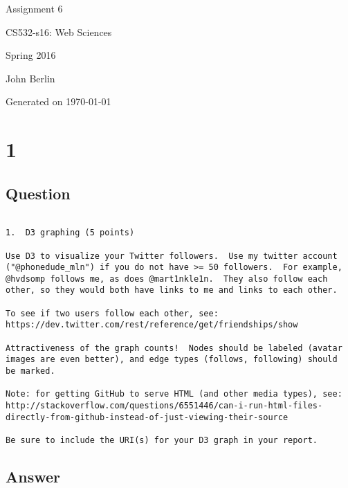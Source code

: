\documentclass[letterpaper,10pt]{article}
\begin{document}
 

\begin{titlepage}

\begin{center}

\Huge{Assignment 6}

\Large{CS532-s16:  Web Sciences}

\Large{Spring 2016}

\Large{John Berlin}

\Large Generated on \today

\end{center}

\end{titlepage}
\newpage
\section*{1}
\subsection*{Question}
\begin{verbatim}

1.  D3 graphing (5 points)

Use D3 to visualize your Twitter followers.  Use my twitter account
("@phonedude_mln") if you do not have >= 50 followers.  For example,
@hvdsomp follows me, as does @mart1nkle1n.  They also follow each
other, so they would both have links to me and links to each other.

To see if two users follow each other, see:
https://dev.twitter.com/rest/reference/get/friendships/show

Attractiveness of the graph counts!  Nodes should be labeled (avatar
images are even better), and edge types (follows, following) should
be marked.

Note: for getting GitHub to serve HTML (and other media types), see:
http://stackoverflow.com/questions/6551446/can-i-run-html-files-directly-from-github-instead-of-just-viewing-their-source

Be sure to include the URI(s) for your D3 graph in your report. 
\end{verbatim}
\newpage
\subsection*{Answer}
\end{document}

